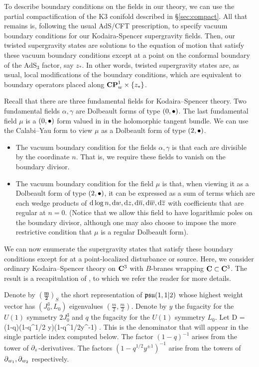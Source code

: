 \documentclass[../main.tex]{subfiles}
\begin{document}
To describe boundary conditions on the fields in our theory, we can use the partial compactification of the K3 conifold described in \S \ref{sec:compact}. All that remains is, following the usual AdS/CFT prescription, to specify vacuum boundary conditions for our Kodaira-Spencer supergravity fields. Then, our twisted supergravity states are solutions to the equation of motion that satisfy these vacuum boundary conditions except at a point on the conformal boundary of the AdS$_3$ factor, say $z_*$. In other words, twisted supergravity states are, as usual, local modifications of the boundary conditions, which are equivalent to boundary operators placed along  $\mathbf{CP}^1_w \times \left\lbrace z_* \right\rbrace$. 

Recall that there are three fundamental fields for Kodaira--Spencer theory.
Two fundamental fields $\alpha, \gamma$ are Dolbeault forms of type $(0,{\bullet})$.
The last fundamental field $\mu$ is a $(0,{\bullet})$ form valued in in the holomorphic tangent bundle.
We can use the Calabi--Yau form to view $\mu$ as a Dolbeault form of type $(2,{\bullet})$.

\begin{itemize}
\item The vacuum boundary condition for the fields $\alpha, \gamma$ is that each are divisible by the coordinate $n$. That is, we require these fields to vanish on the boundary divisor.
\item The vacuum boundary condition for the field $\mu$ is that, when viewing it as a Dolbeault form of type $(2,{\bullet})$, it can be expressed as a sum of terms which are each wedge products of $\mathrm{d} \log n, \mathrm{d} w, \mathrm{d} z , \mathrm{d} \overline n, \mathrm{d} \overline w , \mathrm{d} \overline z$ with coefficients that are regular at $n = 0$. (Notice that we allow this field to have logarithmic poles on the boundary divisor, although one may also choose to impose the more restrictive condition that $\mu$ is a regular Dolbeault form). 
\end{itemize} 

We can now enumerate the supergravity states that satisfy these boundary conditions except for at a point-localized disturbance or source. 
Here, we consider ordinary Kodaira--Spencer theory on $\mathbf{C}^3$ with $B$-branes wrapping $\mathbf{C} \subset \mathbf{C}^3$.
The result is a recapitulation of \cite{CostelloGaiotto}, to which we refer the reader for more details. 

Denote by $\left(\mathbf{\frac{m}{2}}\right)_S$ the short representation of $\mathfrak{psu}(1,1|2)$ whose highest weight vector has $(J_0^3,L_0)$ eigenvalues $(\frac{m}{2}, \frac{m}{2})$. 
Denote by $y$ the fugacity for the $U(1)$ symmetry $2J_0^3$ and $q$ the fugacity for the $U(1)$ symmetry $L_0$.
Let
\beqn
D = (1-q)(1-q^{1/2} y)(1-q^{1/2}y^{-1}) .
\eeqn
This is the denominator that will appear in the single particle index computed below.
The factor $(1-q)^{-1}$ arises from the tower of $\partial_z$-derivatives.
The factors $(1-q^{1/2} y^{\pm 1})^{-1}$ arise from the towers of $\partial_{w_1},\partial_{w_2}$ respectively.
\end{document}
